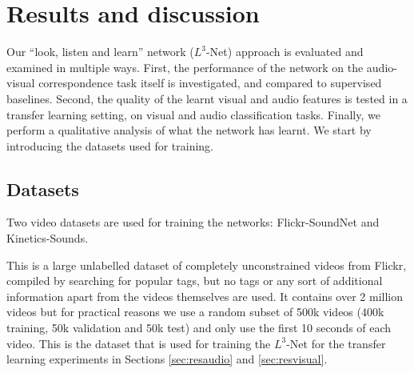 \documentclass[10pt,twocolumn,letterpaper]{article}
\renewcommand{\paragraph}[1]{\smallskip\noindent{\bf{#1}}}
\begin{document}
%
\section{Results and discussion}
\label{sec:results}

Our ``look, listen and learn'' network ($L^3$-Net) approach is evaluated and examined
in multiple ways.
First, the performance of the network on the audio-visual correspondence
task itself is investigated, and compared to supervised baselines.
Second, the quality of the learnt visual and audio features is tested
in a transfer learning setting, on visual and audio classification tasks.
Finally, we perform a qualitative analysis of what the network has learnt.
We start by introducing the datasets used for training.


%
\subsection{Datasets}
\label{sec:datasets}

Two video datasets are used for training the networks:
Flickr-SoundNet and Kinetics-Sounds.

\paragraph{Flickr-SoundNet \cite{Aytar16}.}
This is a large unlabelled dataset of completely unconstrained videos
from Flickr, compiled by searching for popular tags, but no tags
or any sort of additional information apart from the videos themselves
are used.
It contains over 2 million videos but for practical reasons we
use a random subset of 500k videos
(400k training, 50k validation and 50k test)
and only use the first 10 seconds of each video.
This is the dataset that is used for training the $L^3$-Net
for the transfer learning experiments in
Sections \ref{sec:resaudio} and \ref{sec:resvisual}. 
\end{document}
